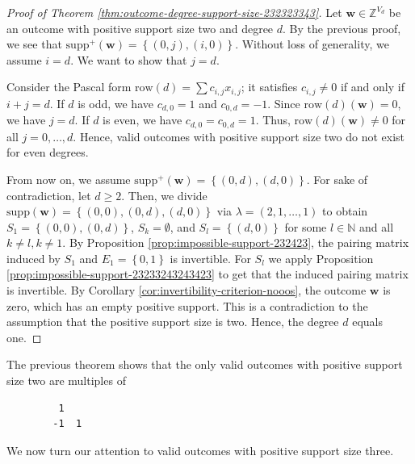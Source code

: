\begin{proof}[Proof of Theorem \ref{thm:outcome-degree-support-size-232323343}]
    Let \( \mathbf{w} \in \mathbb{Z}^{V_d} \) be an outcome with positive support size two and degree \( d \).
    By the previous proof, we see that \( \mathrm{supp}^+({\mathbf{w}}) = \left\{  (0,j), (i,0) \right\} \). Without loss of generality, we assume \( i = d \). We want to show that \( j = d \). 
    
    Consider the Pascal form \( \mathrm{row}(d) = \sum c_{i,j} x_{i,j} \); it satisfies \( c_{i,j} \neq 0 \) if and only if \( i + j = d \). If \( d \) is odd, we have \( c_{d,0} = 1 \) and \( c_{0,d} = -1 \). Since \( \mathrm{row}(d)(\mathbf{w}) = 0 \), we have \( j = d \). If \( d \) is even, we have \( c_{d,0} = c_{0,d} = 1 \). Thus, \( \mathrm{row}(d)(\mathbf w) \neq 0 \) for all \( j = 0, \dots, d \). Hence, valid outcomes with positive support size two do not exist for even degrees.

    From now on, we assume \(         \mathrm{supp}^+({\mathbf{w}}) = \left\{  (0,d), (d,0) \right\}    \).
    For sake of contradiction, let \( d \geq 2 \). Then, we divide \( \mathrm{supp}({\mathbf{w}}) = \left\{  (0,0) , (0,d), (d,0) \right\} \)
    via \( \lambda = (2,1,\dots,1) \) to obtain \( S_1 = \left\{ (0,0), (0,d) \right\} \), \( S_k = \emptyset \), and \( S_l = \left\{ (d,0) \right\} \) for some \( l \in \mathbb{N} \) and all \( k \neq l, k \neq 1 \). By Proposition \ref{prop:impossible-support-232423}, the pairing matrix induced by \( S_1 \) and \( E_1 = \left\{ 0,1 \right\} \) is invertible. For \( S_l \) we apply Proposition \ref{prop:impossible-support-23233243243423} to get that the induced pairing matrix is invertible. By Corollary \ref{cor:invertibility-criterion-nooos}, the outcome \( \mathbf{w} \) is zero, which has an empty positive support. This is a contradiction to the assumption that the positive support size is two. Hence, the degree \( d \) equals one.
\end{proof}

\begin{example}
    The previous theorem shows that the only valid outcomes with positive support size two are multiples of
    \begin{verbatim}
         1
        -1  1
    \end{verbatim}
\end{example}

We now turn our attention to valid outcomes with positive support size three.

